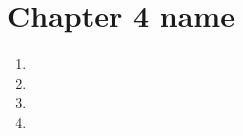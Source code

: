 \chapter{Chapter 4 name}


\begin{enumerate}
    \item 
    \item  
    \item 
    \item 
  \end{enumerate}


